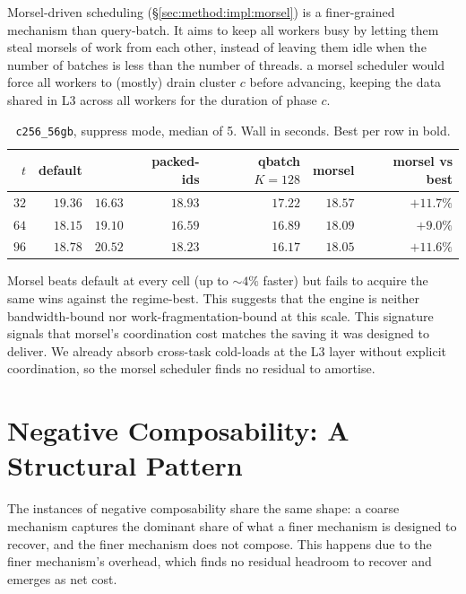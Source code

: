 Morsel-driven scheduling (§\ref{sec:method:impl:morsel}) is a finer-grained mechanism than query-batch. It aims to keep all workers busy by letting them steal morsels of work from each other, instead of leaving them idle when the number of batches is less than the number of threads. a morsel scheduler would force all workers to (mostly) drain cluster $c$ before advancing, keeping the data shared in L3 across all workers for the duration of phase $c$.

\begin{table}[H]
  \centering
  \caption[Morsel vs.\ regime-best builds.]{\texttt{c256\_56gb}, suppress mode, median of 5. Wall in seconds. Best per row in bold.}
  \label{tab:morsel}
  \footnotesize
  \begin{tabular}{rrrrrrr}
    \toprule
    $t$ & default & \bcombo{} & packed-ids & qbatch $K{=}128$ & morsel & morsel vs best \\
    \midrule
    $32$ & $19.36$ & $\mathbf{16.63}$ & $18.93$ & $17.22$ & $18.57$ & $+11.7\%$ \\
    $64$ & $18.15$ & $19.10$ & $\mathbf{16.59}$ & $16.89$ & $18.09$ & $+9.0\%$ \\
    $96$ & $18.78$ & $20.52$ & $18.23$ & $\mathbf{16.17}$ & $18.05$ & $+11.6\%$ \\
    \bottomrule
  \end{tabular}
\end{table}

Morsel beats default at every cell (up to $\sim\!4\%$ faster) but fails to acquire the same wins against the regime-best. This suggests that the engine is neither bandwidth-bound nor work-fragmentation-bound at this scale. This signature signals that morsel's coordination cost matches the saving it was designed to deliver. We already absorb cross-task cold-loads at the L3 layer without explicit coordination, so the morsel scheduler finds no residual to amortise.

\section{Negative Composability: A Structural Pattern\label{sec:exp:negcomp}}

The instances of negative composability share the same shape: a coarse mechanism captures the dominant share of what a finer mechanism is designed to recover, and the finer mechanism does not compose. This happens due to the finer mechanism's overhead, which finds no residual headroom to recover and emerges as net cost.

